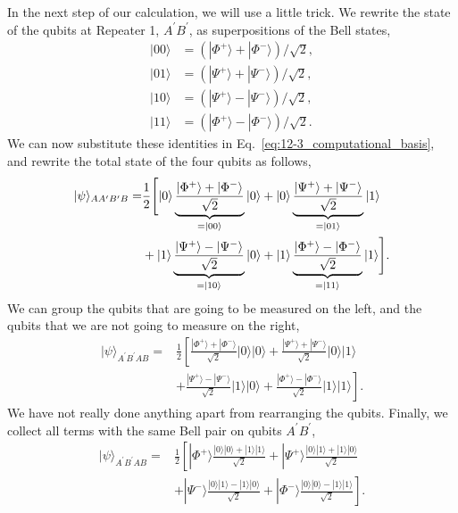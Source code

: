 In the next step of our calculation, we will use a little trick.
We rewrite the state of the qubits at Repeater 1, $A^{\prime}B^{\prime}$, as superpositions of the Bell states,
\begin{align}
    |00\rangle & = \left( |\Phi^{+}\rangle + |\Phi^{-}\rangle\right) / \sqrt{2}, \\
    |01\rangle & = \left( |\Psi^{+}\rangle + |\Psi^{-}\rangle\right) / \sqrt{2}, \\
    |10\rangle & = \left( |\Psi^{+}\rangle - |\Psi^{-}\rangle\right) / \sqrt{2}, \\
    |11\rangle & = \left(|\Phi^{+}\rangle - |\Phi^{-}\rangle\right) / \sqrt{2}.
\end{align}
We can now substitute these identities in Eq.~\ref{eq:12-3_computational_basis}, and rewrite the total state of the four qubits as follows,
\begin{align}
    |\psi\rangle_{AA^{\prime}B^{\prime}B} = & \frac{1}{2} \Biggl[ |0\rangle \underbrace{\frac{|\Phi^+\rangle + |\Phi^-\rangle}{\sqrt{2}}}_{=\left| 00 \right\rangle} |0\rangle + |0\rangle \underbrace{\frac{|\Psi^+\rangle + |\Psi^-\rangle}{\sqrt{2}}}_{=\left| 01 \right\rangle} |1\rangle \nonumber\\
    & + |1\rangle \underbrace{\frac{|\Psi^+\rangle - |\Psi^-\rangle}{\sqrt{2}}}_{=\left| 10 \right\rangle} |0\rangle + |1\rangle \underbrace{\frac{|\Phi^+\rangle - |\Phi^-\rangle}{\sqrt{2}}}_{=\left| 11 \right\rangle} |1\rangle \Biggr].
\end{align}
We can group the qubits that are going to be measured on the left, and the qubits that we are not going to measure on the right,
\begin{align}
    |\psi\rangle_{A^{\prime}B^{\prime}AB} = & \frac{1}{2} \left[ \frac{|\Phi^+\rangle + |\Phi^-\rangle}{\sqrt{2}}|0\rangle|0\rangle + \frac{|\Psi^+\rangle + |\Psi^-\rangle}{\sqrt{2}}|0\rangle|1\rangle \right. \nonumber\\
    & + \left. \frac{|\Psi^+\rangle - |\Psi^-\rangle}{\sqrt{2}}|1\rangle|0\rangle + \frac{|\Phi^+\rangle - |\Phi^-\rangle}{\sqrt{2}}|1\rangle|1\rangle \right].
\end{align}
We have not really done anything apart from rearranging the qubits.
Finally, we collect all terms with the same Bell pair on qubits $A^{\prime}B^{\prime}$,
\begin{align}
    |\psi\rangle_{A^{\prime}B^{\prime}AB} = & \frac{1}{2} \left[ |\Phi^+\rangle \frac{|0\rangle|0\rangle + |1\rangle|1\rangle}{\sqrt{2}} + |\Psi^+\rangle \frac{|0\rangle|1\rangle + |1\rangle|0\rangle}{\sqrt{2}} \right. \nonumber\\
    & + \left. |\Psi^-\rangle \frac{|0\rangle|1\rangle - |1\rangle|0\rangle}{\sqrt{2}} + |\Phi^-\rangle \frac{|0\rangle|0\rangle - |1\rangle|1\rangle}{\sqrt{2}} \right].
    \label{eq:12-3_almost_final}
\end{align}
